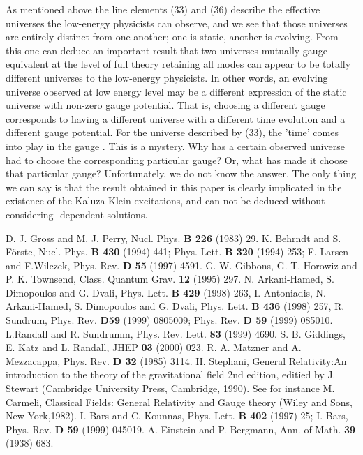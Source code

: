\documentclass[a4paper,12pt]{article}
\begin{document}
 As mentioned above the line elements (33) and (36)
describe the effective universes the low-energy physicists can
observe, and we see that those universes are entirely distinct
from one another; one is static, another is evolving. From this
one can deduce an important result that two universes mutually
gauge equivalent at the level of full theory retaining all \coordHE{} modes can appear to be totally different universes to the
low-energy physicists. In other words, an evolving universe
observed at low energy level may be a different expression of the
static universe with non-zero gauge potential. That is, choosing a
different gauge corresponds to having a different universe with a
different time evolution and a different gauge potential. For the
universe described by (33), the 'time' comes into play in the
gauge \coordHE{}. This is a mystery. Why has a certain observed
universe had to choose the corresponding particular gauge? Or,
what has made it choose that particular gauge? Unfortunately, we
do not know the answer. The only thing we can say is that the
result obtained in this paper is clearly implicated in the
existence of the Kaluza-Klein excitations, and can not be deduced
without considering \coordHE{}-dependent solutions.
\begin{thebibliography}{123}
D. J. Gross and M. J. Perry, Nucl. Phys. {\bf B 226} 
(1983) 29.
K. Behrndt and S. F\"{o}rste, Nucl. Phys. {\bf B  430}
(1994) 441; Phys. Lett. {\bf B 320} (1994) 253; F. Larsen and
F.Wilczek, Phys. Rev. {\bf D 55} (1997) 4591.
G. W. Gibbons, G. T. Horowiz and P. K. Townsend, Class.
Quantum Grav. {\bf 12} (1995) 297.
N. Arkani-Hamed, S. Dimopoulos and G. Dvali, Phys.
Lett. {\bf B 429} (1998) 263, I. Antoniadis, N. Arkani-Hamed, S.
Dimopoulos and G. Dvali, Phys. Lett. {\bf B 436} (1998) 257, R.
Sundrum, Phys. Rev. {\bf D59} (1999) 0805009; Phys. Rev. {\bf D
59} (1999) 085010.
L.Randall and R. Sundrumm, Phys. Rev. Lett. {\bf 83}
(1999) 4690.
S. B. Giddings, E. Katz and L. Randall, JHEP {\bf 03}
(2000) 023.
R. A. Matzner and A. Mezzacappa, Phys. Rev. {\bf D 32}
(1985) 3114.
H. Stephani, General Relativity:An introduction to the
theory of the gravitational field 2nd edition, editied by J.
Stewart (Cambridge University Press, Cambridge, 1990).
See for instance M. Carmeli, Classical Fields: General
 Relativity and Gauge theory (Wiley and Sons, New York,1982).
I. Bars and C. Kounnas, Phys. Lett. {\bf B 402} (1997)
25; I. Bars, Phys. Rev. {\bf D 59} (1999) 045019.
A. Einstein and P. Bergmann, Ann. of Math. {\bf 39}
(1938) 683.
\end{thebibliography}
\end{document}

